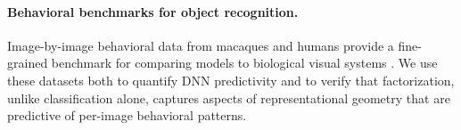 \paragraph{Behavioral benchmarks for object recognition.}
Image-by-image behavioral data from macaques and humans provide a fine-grained benchmark for comparing models to biological visual systems \cite{rajalingham2018large,majaj2015simple}. We use these datasets both to quantify DNN predictivity and to verify that factorization, unlike classification alone, captures aspects of representational geometry that are predictive of per-image behavioral patterns.
